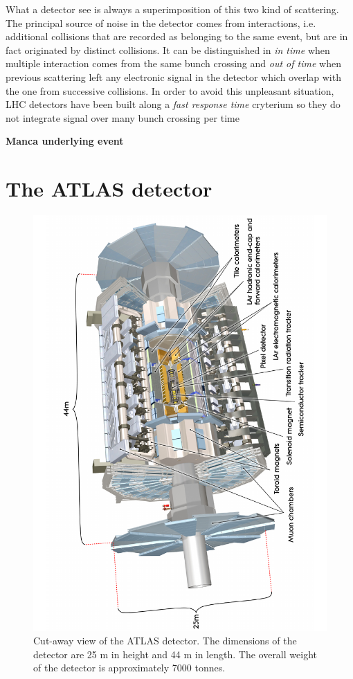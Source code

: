 What a detector see is always a superimposition of this two kind of scattering. The principal source of noise in the detector comes from \pileup interactions, i.e. additional \pp collisions that are recorded as belonging to the same event, but are in fact originated by distinct collisions. It can be distinguished in \emph{in time \pileup} when multiple interaction comes from the same bunch crossing and \emph{out of time \pileup} when previous scattering left any electronic signal in the detector which overlap with the one from successive collisions. In order to avoid this unpleasant situation, LHC detectors have been built along a \emph{fast response time} cryterium so they do not integrate signal over many bunch crossing per time

\textbf{Manca underlying event}

\section{The ATLAS detector}
\begin{figure}[tp]
	\centering
	\includegraphics[scale=0.4,angle=-90]{LHC_ATLAS/0803012_01}
	\caption{Cut-away view of the ATLAS detector. The dimensions of the detector are 25 m in height and 44 m in length. The overall weight of the detector is approximately 7000 tonnes.}	
	\label{fig:atlas}
\end{figure}
